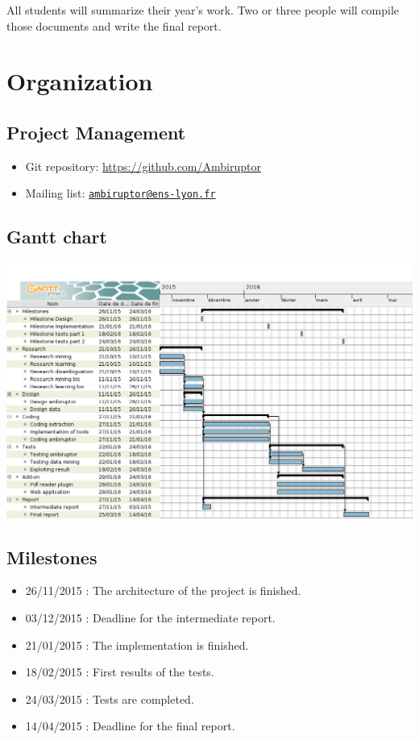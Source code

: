 \documentclass[11pt,a4paper]{article}
\begin{document}
All students will summarize their year's work. Two or three people will compile those documents and write the final report.

\section{Organization}

\subsection{Project Management}

\begin{itemize}
	\item Git repository: \url{https://github.com/Ambiruptor}
	\item Mailing list: \href{mailto:ambiruptor@ens-lyon.fr}{\texttt{ambiruptor@ens-lyon.fr}}
\end{itemize}

\subsection{Gantt chart}

\includegraphics[width=\textwidth]{ambiruptor.png}

\subsection{Milestones}

\begin{itemize}
	\item 26/11/2015 : The architecture of the project is finished.
	\item 03/12/2015 : Deadline for the intermediate report.
	\item 21/01/2015 : The implementation is finished.
	\item 18/02/2015 : First results of the tests.
	\item 24/03/2015 : Tests are completed.
	\item 14/04/2015 : Deadline for the final report.
\end{itemize}
\end{document}
